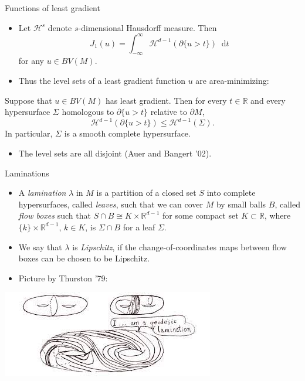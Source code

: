 \documentclass[10pt]{beamer}
\newcommand{\RR}{\mathbb{R}}
\newcommand*\dif{\mathop{}\!\mathrm{d}}
\begin{document}
\begin{frame}{Functions of least gradient}
\begin{itemize}
\item Let $\mathcal H^s$ denote $s$-dimensional Hausdorff measure. Then
$$J_1(u) = \int_{-\infty}^\infty \mathcal H^{d - 1}(\partial \{u > t\}) \dif t$$
for any $u \in BV(M)$. \pause
\item Thus the level sets of a least gradient function $u$ are area-minimizing: \pause
\end{itemize}

\begin{theorem}
Suppose that $u \in BV(M)$ has least gradient.
Then for every $t \in \RR$ and every hypersurface $\Sigma$ homologous to $\partial \{u > t\}$ relative to $\partial M$,
$$\mathcal H^{d - 1}(\partial \{u > t\}) \leq \mathcal H^{d - 1}(\Sigma).$$
In particular, $\Sigma$ is a smooth complete hypersurface.
\end{theorem} \pause

\begin{itemize}
\item The level sets are all disjoint (Auer and Bangert '02).
\end{itemize}
\end{frame}

\begin{frame}{Laminations}
\begin{itemize}
\item A \emph{lamination} $\lambda$ in $M$ is a partition of a closed set $S$ into complete hypersurfaces, called \emph{leaves}, such that we can cover $M$ by small balls $B$, called \emph{flow boxes} such that $S \cap B \cong K \times \RR^{d - 1}$ for some compact set $K \subset \RR$, where $\{k\} \times \RR^{d - 1}$, $k \in K$, is $\Sigma \cap B$ for a leaf $\Sigma$. \pause
\item We say that $\lambda$ is \emph{Lipschitz}, if the change-of-coordinates maps between flow boxes can be chosen to be Lipschitz. \pause
\item Picture by Thurston '79:
\end{itemize}

\begin{center}
    \includegraphics[scale=0.68]{GeodesicLamination.jpg}
\end{center}
\end{frame}
\end{document}
